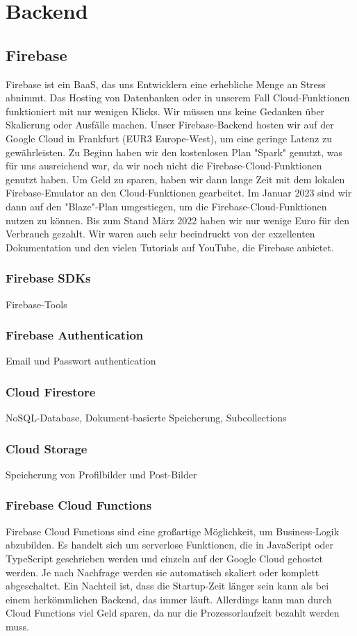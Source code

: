 \section{Backend}

\subsection{Firebase}
\author{Martin Hausleitner}
Firebase ist ein BaaS, das uns Entwicklern eine erhebliche Menge an Stress abnimmt. Das Hosting von Datenbanken oder in unserem Fall Cloud-Funktionen funktioniert mit nur wenigen Klicks. Wir müssen uns keine Gedanken über Skalierung oder Ausfälle machen. Unser Firebase-Backend hosten wir auf der Google Cloud in Frankfurt (EUR3 Europe-West), um eine geringe Latenz zu gewährleisten. Zu Beginn haben wir den kostenlosen Plan "Spark" genutzt, was für uns ausreichend war, da wir noch nicht die Firebase-Cloud-Funktionen genutzt haben. Um Geld zu sparen, haben wir dann lange Zeit mit dem lokalen Firebase-Emulator an den Cloud-Funktionen gearbeitet. Im Januar 2023 sind wir dann auf den "Blaze"-Plan umgestiegen, um die Firebase-Cloud-Funktionen nutzen zu können. Bis zum Stand März 2022 haben wir nur wenige Euro für den Verbrauch gezahlt. Wir waren auch sehr beeindruckt von der exzellenten Dokumentation und den vielen Tutorials auf YouTube, die Firebase anbietet.


\subsubsection{Firebase SDKs}
\author{Sandin Habibovic}
Firebase-Tools

\subsubsection{Firebase Authentication}
\author{Sandin Habibovic}
Email und Passwort authentication

\subsubsection{Cloud Firestore}
\author{Sandin Habibovic}
NoSQL-Database, Dokument-basierte Speicherung, Subcollections
\subsubsection{Cloud Storage}
\author{Sandin Habibovic}
Speicherung von Profilbilder und Post-Bilder
\subsubsection{Firebase Cloud Functions}
\author{Martin Hausleitner}
Firebase Cloud Functions sind eine großartige Möglichkeit,
um Business-Logik abzubilden. Es handelt sich um serverlose
Funktionen, die in JavaScript oder TypeScript geschrieben
werden und einzeln auf der Google Cloud gehostet werden. Je
nach Nachfrage werden sie automatisch skaliert oder komplett
abgeschaltet. Ein Nachteil ist, dass die Startup-Zeit länger
sein kann als bei einem herkömmlichen Backend, das immer
läuft. Allerdings kann man durch Cloud Functions viel Geld
sparen, da nur die Prozessorlaufzeit bezahlt werden muss.

